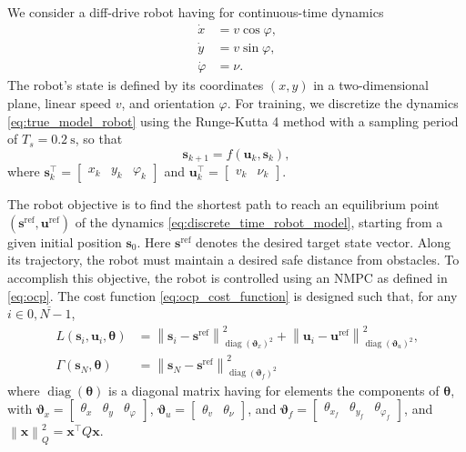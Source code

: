 \documentclass[letterpaper, 10pt, conference]{ieeeconf}
\begin{document}
We consider a diff-drive robot having for continuous-time dynamics \cite{sani2021dynamic}
	\begin{subequations} \label{eq:true_model_robot}
		\begin{align}
			\dot{x} & = v\cos\varphi\text{,}\\
			\dot{y} & = v\sin\varphi\text{,}\\
			\dot{\varphi} & = \nu\text{.}
		\end{align}
	\end{subequations}
The robot's state is defined by its coordinates $(x, y)$ in a two-dimensional plane, linear speed $v$, and orientation $\varphi$.
For training, we discretize the dynamics \eqref{eq:true_model_robot} using the Runge-Kutta 4 method with a sampling period of $T_s = \SI{0.2}{\second}$, so that
\begin{equation} \label{eq:discrete_time_robot_model}
	\mathbf{s}_{k + 1} = f(\mathbf{u}_k, \mathbf{s}_k),
\end{equation}
where $\mathbf{s}_k^{\top} = \begin{bmatrix}x_k & y_k & \varphi_k\end{bmatrix}$ and $\mathbf{u}_k^{\top} = \begin{bmatrix}v_k & \nu_k\end{bmatrix}$.

The robot objective is to find the shortest path to reach an equilibrium point $(\mathbf{s}^{\text{ref}}, \mathbf{u}^{\text{ref}})$ of the dynamics \eqref{eq:discrete_time_robot_model}, starting from a given initial position $\mathbf{s}_0$.
Here $\mathbf{s}^{\text{ref}}$ denotes the desired target state vector. 
Along its trajectory, the robot must maintain a desired safe distance from obstacles.
To accomplish this objective, the robot is controlled using an NMPC as defined in \eqref{eq:ocp}. 
The cost function \eqref{eq:ocp_cost_function} is designed such that, for any $i\in\overline{0,N - 1}$,
\begin{align*}\label{eq:NMPC_cost}
	L(\mathbf{s}_i, \mathbf{u}_i, \boldsymbol{\theta}) & = \left\|\mathbf{s}_i -\mathbf{s}^{\text{ref}}\right\|_{\operatorname{diag}(\boldsymbol{\vartheta}_x)^2}^2	+ \left\|\mathbf{u}_i - \mathbf{u}^{\text{ref}}\right\|_{\operatorname{diag}(\boldsymbol{\vartheta}_u)^2}^2\text{,}\\
	\Gamma (\mathbf{s}_N, \boldsymbol{\theta}) & = \left\|\mathbf{s}_N - \mathbf{s}^{\text{ref}}\right\|_{\operatorname{diag}(\boldsymbol{\vartheta}_f)^2}^2
\end{align*}
where $\operatorname{diag}(\boldsymbol{\theta})$ is a diagonal matrix having for elements the components of $\boldsymbol{\theta}$, with $\boldsymbol{\vartheta}_x = \begin{bmatrix}\theta_x & \theta_y & \theta_{\varphi}\end{bmatrix}$, $\boldsymbol{\vartheta}_u = \begin{bmatrix}\theta_v & \theta_{\nu}\end{bmatrix}$, and $\boldsymbol{\vartheta}_f = \begin{bmatrix}\theta_{x_f} & \theta_{y_f} & \theta_{\varphi_f}\end{bmatrix}$, and $\left\|\mathbf{x}\right\|_Q^2 = \mathbf{x}^{\top}Q\mathbf{x}$.
\end{document}
